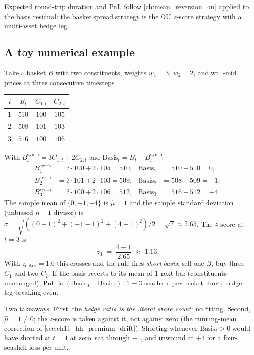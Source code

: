 Expected round-trip duration and PnL follow
\cref{ch:mean_reversion_ou} applied to the basis residual: the
basket spread strategy is the OU $z$-score strategy with a
multi-asset hedge leg.

\subsection{A toy numerical example}
\label{sec:ch11_toy_example}

Take a basket $B$ with two constituents, weights $w_1 = 3$,
$w_2 = 2$, and wall-mid prices at three consecutive timesteps:
\begin{center}
\begin{tabular}{rccc}
\toprule
$t$ & $B_t$ & $C_{1,t}$ & $C_{2,t}$ \\
\midrule
$1$ & $510$ & $100$ & $105$ \\
$2$ & $508$ & $101$ & $103$ \\
$3$ & $516$ & $100$ & $106$ \\
\bottomrule
\end{tabular}
\end{center}

With $B^{\text{synth}}_t = 3 C_{1,t} + 2 C_{2,t}$ and
$\text{Basis}_t = B_t - B^{\text{synth}}_t$:
\begin{align*}
  B^{\text{synth}}_1 &= 3 \cdot 100 + 2 \cdot 105 = 510, &
  \text{Basis}_1 &= 510 - 510 = 0, \\
  B^{\text{synth}}_2 &= 3 \cdot 101 + 2 \cdot 103 = 509, &
  \text{Basis}_2 &= 508 - 509 = -1, \\
  B^{\text{synth}}_3 &= 3 \cdot 100 + 2 \cdot 106 = 512, &
  \text{Basis}_3 &= 516 - 512 = +4.
\end{align*}
The sample mean of $\{0, -1, +4\}$ is $\hat\mu = 1$ and the sample
standard deviation (unbiased $n - 1$ divisor) is
$\hat\sigma = \sqrt{((0-1)^2 + (-1-1)^2 + (4-1)^2)/2}
= \sqrt{7} \approx 2.65$. The $z$-score at $t = 3$ is
\begin{equation*}
  z_3 \;=\; \frac{4 - 1}{2.65} \;\approx\; 1.13.
\end{equation*}
With $z_{\text{entry}} = 1.0$ this crosses and the rule fires
\emph{short basis}: sell one $B$, buy three $C_1$ and two $C_2$.
If the basis reverts to its mean of $1$ next bar (constituents
unchanged), PnL is $(\text{Basis}_3 - \text{Basis}_4) \cdot 1 = 3$
seashells per basket short, hedge leg breaking even.

Two takeaways. First, the \emph{hedge ratio is the literal share
count}: no fitting. Second, $\hat\mu = 1 \neq 0$; the $z$-score
is taken against it, not against zero (the running-mean correction
of \cref{sec:ch11_hh_premium_drift}). Shorting whenever
$\text{Basis}_t > 0$ would have shorted at $t = 1$ at zero, sat
through $-1$, and unwound at $+4$ for a four-seashell loss per
unit.

